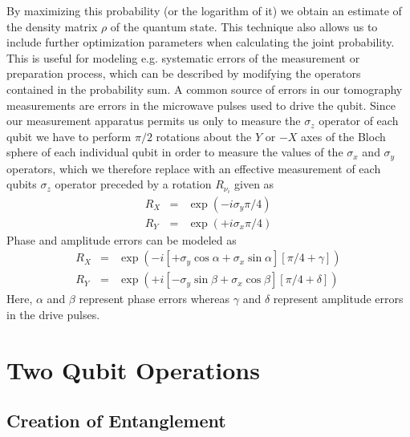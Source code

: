 By maximizing this probability (or the logarithm of it) we obtain an estimate of the density matrix $\rho$ of the quantum state. This technique also allows us to include further optimization parameters when calculating the joint probability. This is useful for modeling e.g. systematic errors of the measurement or preparation process, which can be described by modifying the operators contained in the probability sum. A common source of errors in our tomography measurements are errors in the microwave pulses used to drive the qubit. Since our measurement apparatus permits us only to measure the $\sigma_z$ operator of each qubit we have to perform $\pi/2$ rotations about the $Y$ or $-X$ axes of the Bloch sphere of each individual qubit in order to measure the values of the $\sigma_x$ and $\sigma_y$ operators, which we therefore replace with an effective measurement of each qubits $\sigma_z$ operator preceded by a rotation $R_{\nu_i}$ given as
\begin{eqnarray}
R_{X} & = & \exp{\left( -i \sigma_y \pi / 4\right)} \\
R_{Y} & = & \exp{\left( +i \sigma_x \pi / 4\right)} 
\end{eqnarray}
Phase and amplitude errors can be modeled as
\begin{eqnarray}
R_{X} & = & \exp{\left( -i \left[+\sigma_y\cos{\alpha}+\sigma_x\sin{\alpha} \right] \left[\pi / 4+\gamma\right]\right)} \\
R_{Y} & = & \exp{\left( +i \left[-\sigma_y\sin{\beta}+\sigma_x\cos{\beta}\right] \left[\pi / 4+\delta\right]\right)} 
\end{eqnarray}
Here, $\alpha$ and $\beta$ represent phase errors whereas $\gamma$ and $\delta$ represent amplitude errors in the drive pulses.

\section{Two Qubit Operations}

\subsection{Creation of Entanglement}


